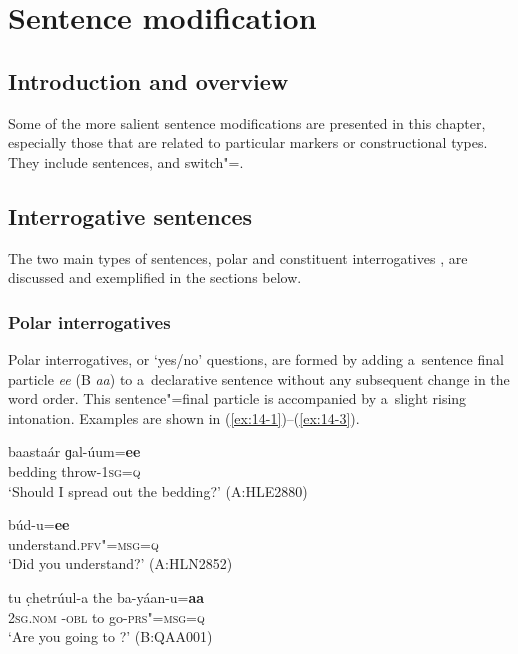 \chapter{Sentence modification}
\label{chap:14}

\section{Introduction and overview}
\label{sec:14-1}


Some of the more salient sentence modifications are presented in this chapter, especially those that are related to particular markers or constructional types. They include  sentences,  and switch"=.


\section{Interrogative sentences}
\label{sec:14-2}


The two main types of  sentences, polar and constituent interrogatives \citep[290--303]{koenigsiemund2007}, are discussed and exemplified in the sections below. 


\subsection{Polar interrogatives}
\label{subsec:14-2-1}


Polar interrogatives, or `yes/no' questions, are formed by adding a~sentence final particle \textit{ee} (B \textit{aa}) to a~declarative sentence without any subsequent change in the word order. This sentence"=final particle is accompanied by a~slight rising intonation. Examples are shown in (\ref{ex:14-1})--(\ref{ex:14-3}).

\begin{exe}
\ex
\label{ex:14-1}
\gll baastaár ɡal-úum=\textbf{ee}  \\
bedding throw-\textsc{1sg=q} \\
\glt `Should I spread out the bedding?' (A:HLE2880)

\ex
\label{ex:14-2}
\gll búd-u=\textbf{ee} \\
understand.\textsc{pfv"=msg=q} \\
\glt `Did you understand?' (A:HLN2852)

\ex
\label{ex:14-3}
\gll tu c̣hetrúul-a the ba-yáan-u=\textbf{aa} \\
\textsc{2sg.nom} \iliChitral-\textsc{obl} to go-\textsc{prs"=msg=q} \\
\glt `Are you going to \iliChitral?' (B:QAA001)
\end{exe}

